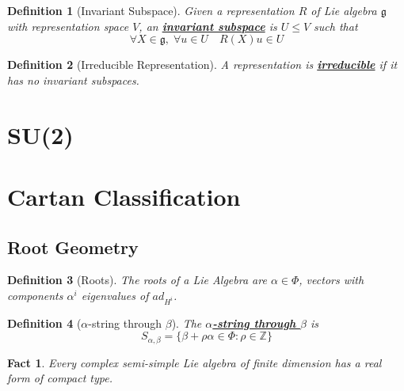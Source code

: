\documentclass{article}
\newtheorem{definition}{Definition}[section]
\newtheorem*{fact}{Fact}
\newcommand{\bam}[1]{\underline{\bf{#1}}}
\newcommand{\mf}[1]{\mathfrak{#1}}
\newcommand{\mbb}[1]{\mathbb{#1}}
\begin{document}
\begin{definition}[Invariant Subspace]
Given a representation $R$ of Lie algebra $\mf{g}$ with representation space $V$, an \bam{invariant subspace} is $U\leq V$ such that
\[
\forall X\in\mf{g}, \; \forall u\in U \quad R\left(X\right)u\in U
\]
\end{definition}

\begin{definition}[Irreducible Representation]
A representation is \bam{irreducible} if it has no invariant subspaces. 
\end{definition}


\section{SU(2)}





\section{Cartan Classification}
\subsection{Root Geometry}

\begin{definition}[Roots]
The roots of a Lie Algebra are $\alpha\in\Phi$, vectors with components $\alpha^i$ eigenvalues of $ad_{H^i}$.
\end{definition}

\begin{definition}[$\alpha$-string through $\beta$]
The \bam{$\alpha$-string through $\beta$} is 
\[
S_{\alpha, \beta}=\lbrace \beta+\rho\alpha\in\Phi : \rho\in\mbb{Z} \rbrace
\]
\end{definition}

\begin{fact}
Every complex semi-simple Lie algebra of finite dimension has a real form of compact type.
\end{fact}
\end{document}
